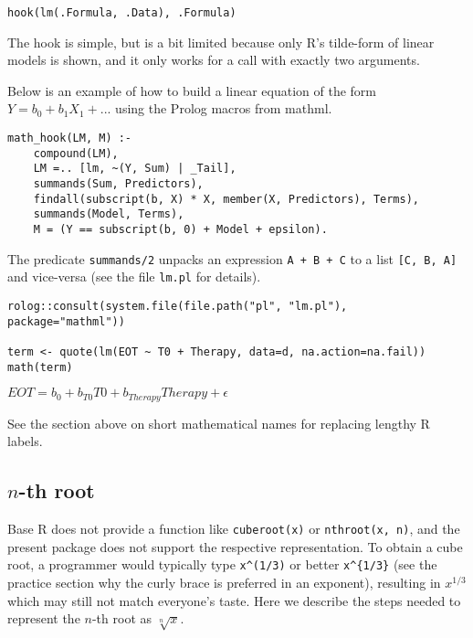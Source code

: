 \begin{verbatim}
hook(lm(.Formula, .Data), .Formula)
\end{verbatim}

The hook is simple, but is a bit limited because only R's tilde-form of
linear models is shown, and it only works for a call with exactly two
arguments.

Below is an example of how to build a linear equation of the form
\(Y = b_0 + b_1X_1 + ...\) using the Prolog macros from mathml.

\begin{verbatim}
math_hook(LM, M) :-
    compound(LM),
    LM =.. [lm, ~(Y, Sum) | _Tail],
    summands(Sum, Predictors),
    findall(subscript(b, X) * X, member(X, Predictors), Terms),
    summands(Model, Terms),
    M = (Y == subscript(b, 0) + Model + epsilon).
\end{verbatim}

The predicate \texttt{summands/2} unpacks an expression \texttt{A~+~B~+~C} to a list
\texttt{{[}C,~B,~A{]}} and vice-versa (see the file \texttt{lm.pl} for details).

\begin{verbatim}
rolog::consult(system.file(file.path("pl", "lm.pl"), package="mathml"))

term <- quote(lm(EOT ~ T0 + Therapy, data=d, na.action=na.fail))
math(term)
\end{verbatim}

\({EOT}{=}{{{{b}_{0}}{+}{{{{b}_{T0}}{{}}{T0}}{+}{{{b}_{Therapy}}{{}}{Therapy}}}}{+}{\epsilon}}\)

See the section above on short mathematical names for replacing
lengthy R labels.

\hypertarget{n-th-root}{%
\subsection{\texorpdfstring{\(n\)-th root}{n-th root}}\label{n-th-root}}

Base R does not provide a function like \texttt{cuberoot(x)} or
\texttt{nthroot(x,~n)}, and the present package does not support the respective
representation. To obtain a cube root, a programmer would typically type
\texttt{x\^{}(1/3)} or better \texttt{x\^{}\{1/3\}} (see the practice section why the curly
brace is preferred in an exponent), resulting in \(x^{1/3}\) which may
still not match everyone's taste. Here we describe the steps needed to
represent the \(n\)-th root as \(\sqrt[n]x\).

